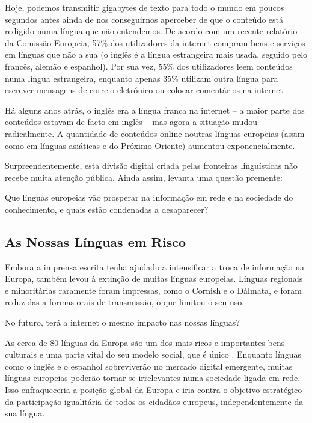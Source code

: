 \begin{multicols}{2}

Hoje, podemos transmitir gigabytes de texto para todo o mundo em poucos segundos antes ainda de nos conseguirnos aperceber de que o conteúdo está redigido numa língua que não entendemos. 
De acordo com um recente relatório da Comissão Europeia, 57\% dos utilizadores da internet compram bens e serviços em línguas que não a sua (o inglês é a língua estrangeira mais usada, seguido pelo francês, alemão e espanhol). Por sua vez, 55\% dos utilizadores leem conteúdos numa língua estrangeira, enquanto apenas 35\% utilizam outra língua para escrever mensagens de correio eletrónico ou colocar comentários na internet \cite{EC1}. 

Há alguns anos atrás, o inglês era a língua franca na internet -- a maior parte dos conteúdos estavam de facto em inglês -- mas agora a si\-tua\-ção mudou radicalmente. A quantidade de conteúdos online noutras línguas europeias (assim como em línguas asiáticas e do Próximo Oriente) aumentou exponencialmente.

Surpreendentemente, esta divisão digital criada pelas fronteiras linguísticas não recebe muita atenção pública. Ainda assim, levanta uma questão premente: 

Que línguas europeias vão prosperar na informação em rede e na sociedade do co\-nhe\-ci\-men\-to, e quais estão condenadas a desaparecer?

\subsection{As Nossas Línguas em Risco}

 Embora a imprensa escrita tenha ajudado a intensificar a troca de informação na Europa, também levou à extinção de muitas línguas europeias. Línguas regionais e minoritárias raramente foram impressas, como o Cornish e o Dálmata, e foram reduzidas a formas orais de transmissão, o que limitou o seu uso. 

No futuro, terá a internet o mesmo impacto nas nossas línguas?

As cerca de 80 línguas da Europa são um dos mais ricos e importantes bens culturais e uma parte vital do seu modelo social, que é único \cite{EC2}. Enquanto línguas como o inglês e o espanhol sobreviverão no mercado digital emergente, muitas línguas europeias poderão tornar-se irrelevantes numa sociedade ligada em rede. Isso enfraqueceria a posição global da Europa e iria contra o objetivo estratégico da participação igualitária de todos os cidadãos europeus, independentemente da sua língua. 


\end{multicols}
